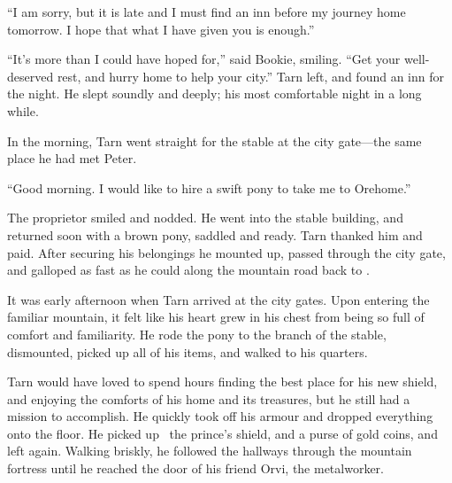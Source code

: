 ``I am sorry, but it is late and I must find an inn before my journey home tomorrow.  I hope that what I have given you is enough.''

``It's more than I could have hoped for,'' said Bookie, smiling.  ``Get your well-deserved rest, and hurry home to help your city.''  Tarn left, and found an inn for the night.  He slept soundly and deeply; his most comfortable night in a long while.

In the morning, Tarn went straight for the stable at the city gate---the same place he had met Peter.

``Good morning.  I would like to hire a swift pony to take me to Orehome.''

The proprietor smiled and nodded.  He went into the stable building, and returned soon with a brown pony, saddled and ready.  Tarn thanked him and paid.  After securing his belongings he mounted up, passed through the city gate, and galloped as fast as he could along the mountain road back to \korbarthrond.

It was early afternoon when Tarn arrived at the city gates.  Upon entering the familiar mountain, it felt like his heart grew in his chest from being so full of comfort and familiarity.  He rode the pony to the \korbarthrond branch of the stable, dismounted, picked up all of his items, and walked to his quarters.

Tarn would have loved to spend hours finding the best place for his new shield, and enjoying the comforts of his home and its treasures, but he still had a mission to accomplish.  He quickly took off his armour and dropped everything onto the floor. He picked up \kildir\, the prince's shield, and a purse of gold coins, and left again.  Walking briskly, he followed the hallways through the mountain fortress until he reached the door of his friend Orvi, the metalworker.